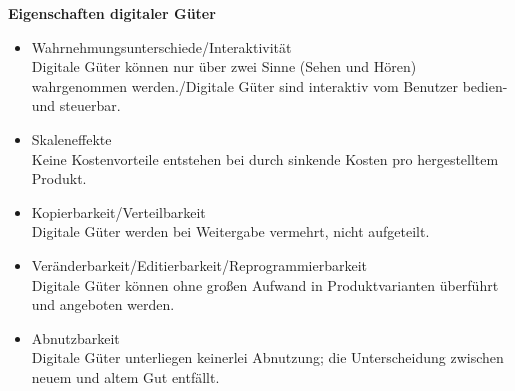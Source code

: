 \documentclass[a4]{scrartcl}
\begin{document}
\vspace*{1em}

\textbf{Eigenschaften digitaler Güter} 

\begin{itemize}
\item Wahrnehmungsunterschiede/Interaktivität \\
Digitale Güter können nur über zwei Sinne (Sehen und Hören) wahrgenommen werden./Digitale Güter sind interaktiv vom Benutzer bedien- und steuerbar.
\item Skaleneffekte \\
Keine Kostenvorteile entstehen bei durch sinkende Kosten pro hergestelltem Produkt.
\item Kopierbarkeit/Verteilbarkeit \\
Digitale Güter werden bei Weitergabe vermehrt, nicht aufgeteilt.
\item Veränderbarkeit/Editierbarkeit/Reprogrammierbarkeit \\
Digitale Güter können ohne großen Aufwand in Produktvarianten überführt und angeboten werden.
\item Abnutzbarkeit \\
Digitale Güter unterliegen keinerlei Abnutzung; die Unterscheidung zwischen neuem und altem Gut entfällt.
\end{itemize}

\newpage
\end{document}
